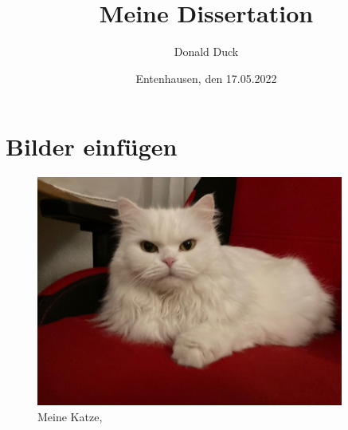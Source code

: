 \documentclass[12pt,ngerman,parskip=half]{scrreprt}
\author{Donald Duck}
\title{Meine Dissertation}
\date{Entenhausen, den 17.05.2022}
\begin{document}
\maketitle

\tableofcontents

\listoffigures

\listoftables

\chapter{Bilder einfügen}

\blindtext

\begin{figure}[hbtp!]%
\begin{center}
\includegraphics[width=0.9\textwidth]{Bilder/Katze}
\end{center}
\caption{Meine Katze, \blindtext}
\end{figure}


\blindtext
\end{document}
